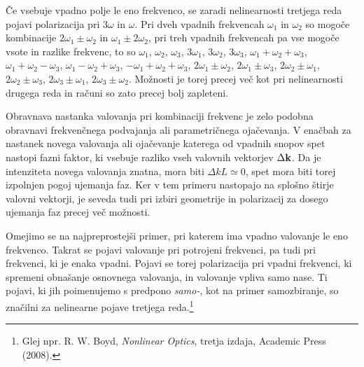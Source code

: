 Če vsebuje vpadno polje le eno frekvenco, se zaradi nelinearnosti tretjega
reda pojavi polarizacija pri 3$\omega$ in $\omega$. Pri dveh vpadnih
frekvencah $\omega_{1}$ in $\omega_{2}$ so mogoče kombinacije $2\omega_{1}\pm\omega_{2}$
in $\omega_{1}\pm2\omega_{2}$, pri treh vpadnih frekvencah pa vse
mogoče vsote in razlike frekvenc, to so $\omega_1$, $\omega_2$, $\omega_3$, 
$3\omega_1$, $3 \omega_2$, $3\omega_3$, 
$\omega_1 + \omega_2 + \omega_3$, $\omega_1 + \omega_2 - \omega_3$, 
$\omega_1 - \omega_2 + \omega_3$, $- \omega_1 + \omega_2 + \omega_3$, 
$2 \omega_1\pm\omega_2$, $2 \omega_1\pm\omega_3$, $2 \omega_2\pm\omega_1$,
$2 \omega_2\pm\omega_3$, $2 \omega_3\pm\omega_1$, $2 \omega_3\pm\omega_2$.
Možnosti je torej precej več kot pri nelinearnosti drugega reda in računi so zato 
precej bolj zapleteni.

Obravnava nastanka valovanja pri
kombinaciji frekvenc je zelo podobna obravnavi frekvenčnega podvajanja ali  parametričnega
ojačevanja. V enačbah za nastanek novega valovanja ali ojačevanje
katerega od vpadnih snopov spet nastopi fazni faktor, ki vsebuje razliko
vseh valovnih vektorjev $\Delta{\bf k}$. Da je intenziteta novega
valovanja znatna, mora biti $\Delta kL\simeq0$, spet mora biti torej
izpolnjen pogoj ujemanja faz. Ker v tem primeru nastopajo na splošno štirje
valovni vektorji, je seveda tudi pri izbiri geometrije in polarizacij
za dosego ujemanja faz precej več možnosti.

Omejimo se na najpreprostejši primer, pri katerem ima vpadno valovanje le eno 
frekvenco. Takrat se pojavi valovanje pri potrojeni frekvenci, pa tudi
pri frekvenci, ki je enaka vpadni. Pojavi se torej polarizacija pri 
vpadni frekvenci, ki spremeni obnašanje osnovnega valovanja, in valovanje vpliva samo nase.
Ti pojavi, ki jih poimenujemo s predpono {\it samo-}, kot na primer samozbiranje, so
značilni za nelinearne pojave tretjega reda.\footnote{Glej 
npr. R. W. Boyd, {\it Nonlinear Optics}, tretja izdaja, Academic Press (2008).}

